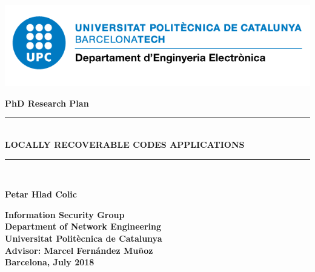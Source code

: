 \documentclass[12pt,a4paper,twoside,openright]{book}
\begin{document}
\newcommand{\titol}{Locally Recoverable Codes Applications}
\newcommand{\shortitol}{LRC Codes}
\newcommand{\autor}{Petar Hlad Colic}
\renewcommand{\cleardoublepage}{}

\frontmatter
\begin{titlepage}
   	\includegraphics[scale=0.3]{images/entel_logo.png}

   	\begin{center}
   	\vspace{2em}
   	\Large\textbf{\textbf{PhD Research Plan}}\\
   	\vspace{3em}
   	\rule{\linewidth}{0.5pt}\\
   	\LARGE\textbf{\MakeUppercase{\titol}} \\
   	\rule{\linewidth}{0.5pt}\\
   	\vspace{3em}
   	
   	\LARGE\textbf{\autor}\\
   	\vspace{3em}
   	
    \Large\textbf{Information Security Group}\\
    \Large\textbf{Department of Network Engineering}\\
   	\Large\textbf{Universitat Politècnica de Catalunya}\\
   	
   	
   	\vspace{2em}
   	\Large\textbf{Advisor: Marcel Fern\'andez Muñoz}\\
   	\vspace{3em}
   	\large\textbf{Barcelona, July 2018}\\
   	\end{center}
\end{titlepage} 

\newpage\null\thispagestyle{empty}\newpage
\newpage{\cleardoublepage}

\newpage{\cleardoublepage}
\end{document}
